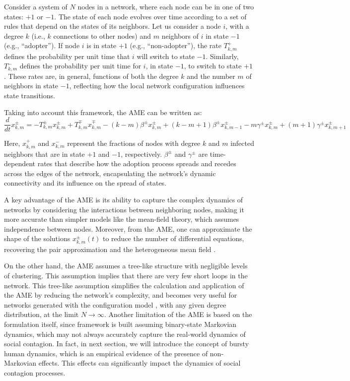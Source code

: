 Consider a system of $N$ nodes in a network, where each node can be in one of two states: $+1$ or $-1$. The state of each node evolves over time according to a set of rules that depend on the states of its neighbors. Let us consider a node $i$, with a degree $k$ (i.e., $k$ connections to other nodes) and $m$ neighbors of $i$ in state $-1$ (e.g., ``adopter''). If node $i$ is in state $+1$ (e.g., ``non-adopter''), the rate \( T^{+}_{k,m} \) defines the probability per unit time that $i$ will switch to state $-1$. Similarly, \( T^{-}_{k,m} \) defines the probability per unit time for $i$, in state $-1$, to switch to state $+1$. These rates are, in general, functions of both the degree $k$ and the number $m$ of neighbors in state $-1$, reflecting how the local network configuration influences state transitions.

Taking into account this framework, the AME can be written as:
\begin{equation}
    \frac{d}{dt} x^{\pm}_{k,m} = -T^{\pm}_{k,m} x^{\pm}_{k,m} + T^{\mp}_{k,m} x^{\mp}_{k,m} - (k-m) \beta^{\pm} x^{\pm}_{k,m} + (k-m+1) \beta^{\pm} x^{\pm}_{k,m-1} - m \gamma^{\pm} x^{\pm}_{k,m} + (m+1) \gamma^{\pm} x^{\pm}_{k,m+1}
\end{equation}

Here, $x^{+}_{k,m}$ and $x^{-}_{k,m}$ represent the fractions of nodes with degree $k$ and $m$ infected neighbors that are in state $+1$ and $-1$, respectively. $\beta^{\pm}$ and $\gamma^{\pm}$ are time-dependent rates that describe how the adoption process spreads and recedes across the edges of the network, encapsulating the network's dynamic connectivity and its influence on the spread of states.

A key advantage of the AME is its ability to capture the complex dynamics of networks by considering the interactions between neighboring nodes, making it more accurate than simpler models like the mean-field theory, which assumes independence between nodes. Moreover, from the AME, one can approximate the shape of the solutions $x^{\pm}_{k,m} (t)$ to reduce the number of differential equations, recovering the pair approximation and the heterogeneous mean field \cite{gleeson-2011,gleeson-2013}.

On the other hand, the AME assumes a tree-like structure with negligible levels of clustering. This assumption implies that there are very few short loops in the network. This tree-like assumption simplifies the calculation and application of the AME by reducing the network's complexity, and becomes very useful for networks generated with the configuration model \cite{newman-book}, with any given degree distribution, at the limit $N \to \infty$. Another limitation of the AME is based on the formulation itself, since framework is built assuming binary-state Markovian dynamics, which may not always accurately capture the real-world dynamics of social contagion. In fact, in next section, we will introduce the concept of bursty human dynamics, which is an empirical evidence of the presence of non-Markovian effects. This effects can significantly impact the dynamics of social contagion processes.

